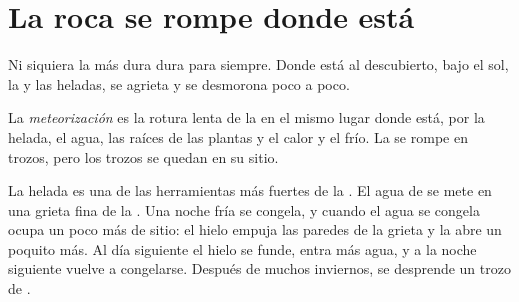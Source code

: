 \section{La roca se rompe donde está}

Ni siquiera la  más dura dura para siempre. Donde está al descubierto,
bajo el sol, la  y las heladas, se agrieta y se desmorona poco a
poco.

\begin{definition}[Meteorización]\label{def:g5:water-shapes-the-land:weathering}
La \emph{meteorización} es la rotura
lenta de la  en el mismo lugar donde está, por la helada, el agua, las
raíces de las plantas y el calor y el frío. La  se rompe en trozos,
pero los trozos se quedan en su sitio.
\end{definition}

La helada es una de las herramientas más fuertes de la . El
agua de  se mete en una grieta fina de la . Una noche fría se
congela, y cuando el agua se congela ocupa un poco más de sitio: el hielo
empuja las paredes de la grieta y la abre un poquito más. Al día siguiente
el hielo se funde, entra más agua, y a la noche siguiente vuelve a
congelarse. Después de muchos inviernos, se desprende un trozo de .

